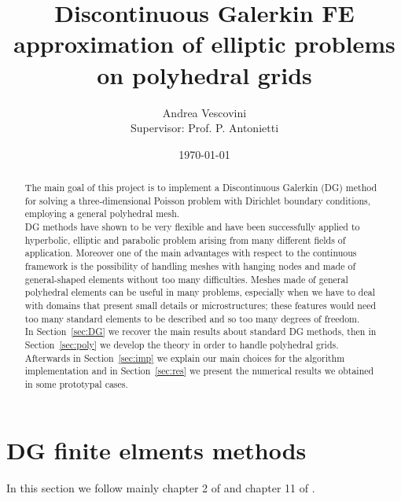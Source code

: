 \documentclass[12pt, a4paper]{article}
\title{\textbf{Discontinuous Galerkin FE approximation of elliptic problems on polyhedral grids}}
\author{Andrea Vescovini\\[1cm]{\small Supervisor: Prof. P. Antonietti}}
\date{\today}
\theoremstyle{definition}
\theoremstyle{plain}
\theoremstyle{plain}
\begin{document}
\maketitle
\newpage
\begin{abstract}
	The main goal of this project is to implement a Discontinuous Galerkin (DG) method for solving a three-dimensional Poisson problem with Dirichlet boundary conditions, employing a general polyhedral mesh.\\
	DG methods have shown to be very flexible and have been successfully applied to hyperbolic, elliptic and parabolic problem arising from many different fields of application.
	Moreover one of the main advantages with respect to the continuous 
	framework is the possibility of handling meshes with hanging nodes and made 
	of general-shaped elements without too many difficulties. Meshes made of 
	general polyhedral elements can be useful in many problems, especially when 
	we have to deal with domains that present small details or microstructures; 
	these features would need too many standard elements to be described and so 
	too many degrees of freedom.\\
	In Section~\ref{sec:DG} we recover the main results about standard DG 
	methods, then in Section~\ref{sec:poly} we develop the theory in order to 
	handle polyhedral grids. Afterwards in Section~\ref{sec:imp} we explain our 
	main choices for the algorithm implementation and in Section~\ref{sec:res} 
	we present the numerical results we obtained in some prototypal cases.
\end{abstract}
\newpage
{}
\tableofcontents
\newpage



\section{DG finite elments methods}\label{sec:DG}
In this section we follow mainly chapter 2 of \cite{riviere} and chapter 11 of \cite{quart}.
\end{document}
